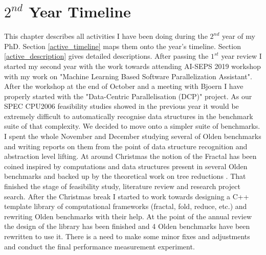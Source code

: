 \documentclass[10pt,a4paper]{report}
\begin{document}
\chapter{$2^{nd}$ Year Timeline}
\quad This chapter describes all activities I have been doing during the $2^{nd}$ year of my PhD. Section \ref{active_timeline} maps them onto the year's timeline. Section \ref{active_description} gives detailed descriptions.\newline\null
\quad After passing the $1^{st}$ year review I started my second year with the work towards attending AI-SEPS 2019 workshop with my work on "Machine Learning Based Software Parallelization Assistant". After the workshop at the end of October and a meeting with Bjoern I have properly started with the "Data-Centric Parallelisation (DCP)" project. As our SPEC CPU2006 feasibility studies showed in the previous year it would be extremely difficult to automatically recognise data structures in the benchmark suite of that complexity. We decided to move onto a simpler suite of benchmarks. I spent the whole November and December studying several of Olden benchmarks and writing reports on them from the point of data structure recognition and abstraction level lifting. At around Christmas the notion of the Fractal has been coined inspired by computations and data structures present in several Olden benchmarks and backed up by the theoretical work on tree reductions \cite{tree-reductions}. That finished the stage of feasibility study, literature review and research project search. After the Christmas break I started to work towards designing a C++ template library of computational frameworks (fractal, fold, reduce, etc.) and rewriting Olden benchmarks with their help. At the point of the annual review the design of the library has been finished and 4 Olden benchmarks have been rewritten to use it. There is a need to make some minor fixes and adjustments and conduct the final performance measurement experiment.
\end{document}
